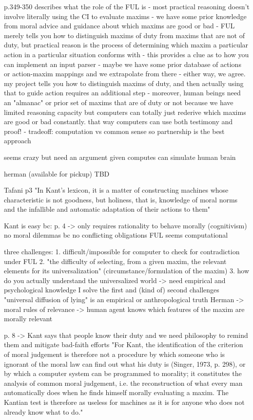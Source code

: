 p.349-350 describes what the role of the FUL is 
- most practical reasoning doesn't involve literally using the CI to evaluate maxims - we have some 
prior knowledge from moral advice and guidance about which maxims are good or bad
- FUL merely tells you how to distinguish maxims of duty from maxims that are not of duty, but practical
reason is the process of determining which maxim a particular action in a particular situation conforms with
  - this provides a clue as to how you can implement an input parser - maybe we have some prior database of 
actions or action-maxim mappings and we extrapolate from there 
  - either way, we agree. my project tells you how to distinguish maxims of duty, and then actually 
using that to guide action requires an additional step
  - moreover, human beings need an "almanac" or prior set of maxims that are of duty or not because we
have limited reasoning capacity but computers can totally just rederive which maxims are good or bad
constantly. that way computers can use both testimony and proof!
- tradeoff: computation vs common sense so partnership is the best approach 

seems crazy but need an argument given computes can simulate human brain 

herman (available for pickup) TBD

Tafani
p3 "In Kant's lexicon, it is a matter of constructing machines whose
characteristic is not goodness, but holiness, that is, knowledge of moral
norms and the infallible and automatic adaptation of their actions to them"

Kant is easy bc:
p. 4 -> only requires rationality to behave morally (cognitivism)
no moral dilemmas bc no conflicting obligations
FUL seems computational

three challenges:
1. difficult/impossible for computer to check for contradiction under FUL
2. "the difficulty of selecting, from a given maxim, the relevant elements for its
universalization" (circumstance/formulation of the maxim)
3. how do you actually understand the universalized world -> need empirical and psychological knowledge
I solve the first and (kind of) second challenges
"universal diffusion of lying" is an empirical or anthropological truth
Herman -> moral rules of relevance -> human agent knows which features of the maxim are morally relevant 

p. 8 -> Kant says that people know their duty and we need philosophy to remind them and mitigate bad-faith efforts
"For Kant, the identification of the criterion of moral judgement is therefore
not a procedure by which someone who is ignorant of the moral law can
find out what his duty is (Singer, 1973, p. 298), or by which a computer
system can be programmed to morality; it constitutes the analysis of
common moral judgement, i.e. the reconstruction of what every man
automatically does when he finds himself morally evaluating a maxim. The
Kantian test is therefore as useless for machines as it is for anyone who does
not already know what to do."


